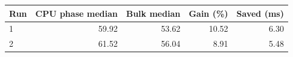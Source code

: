\begin{tabular}{lrrrr}
\hline
Run & CPU phase median & Bulk median & Gain (\%) & Saved (ms) \\
\hline
1 & 59.92 & 53.62 & 10.52 & 6.30 \\
2 & 61.52 & 56.04 & 8.91 & 5.48 \\
\hline
\end{tabular}
